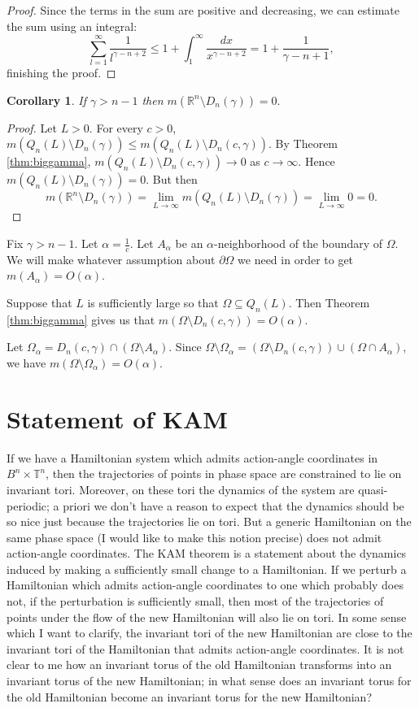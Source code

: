 \documentclass{article}
\newtheorem{corollary}[theorem]{Corollary}
\begin{document}
\begin{proof}
Since the terms in the sum are positive and decreasing, we can estimate the sum using an integral:
\[
\sum_{l=1}^\infty \frac{1}{l^{\gamma-n+2}} \leq 1+ \int_1^\infty
\frac{dx}{x^{\gamma-n+2}} = 1+ \frac{1}{\gamma-n+1},
\]
finishing the proof.
\end{proof}

\begin{corollary}
If $\gamma>n-1$ then $m(\mathbb{R}^n \setminus D_n(\gamma))=0.$ 
\end{corollary}
\begin{proof}
Let $L>0$. For every $c>0$, $m(Q_n(L) \setminus D_n(\gamma))
\leq m(Q_n(L) \setminus D_n(c,\gamma))$. By Theorem \ref{thm:biggamma},
$m(Q_n(L) \setminus D_n(c,\gamma)) \to 0$ as $c \to \infty$. Hence
$m(Q_n(L) \setminus D_n(\gamma))=0$. But then
\[
m(\mathbb{R}^n \setminus
D_n(\gamma)) = \lim_{L \to \infty} m(Q_n(L) \setminus D_n(\gamma))
=\lim_{L \to \infty} 0 =0.
\]
\end{proof}

Fix $\gamma>n-1$.
Let $\alpha=\frac{1}{c}$. Let $A_\alpha$ be an $\alpha$-neighborhood of the boundary of $\Omega$. We will make whatever assumption
about $\partial \Omega$ we need in order to get $m(A_\alpha)=O(\alpha)$. 

Suppose that $L$ is sufficiently large so that $\Omega \subseteq Q_n(L)$. Then Theorem \ref{thm:biggamma} gives us that $m(\Omega \setminus D_n(c,\gamma))=
O(\alpha)$.

Let $\Omega_\alpha=D_n(c,\gamma) \cap (\Omega \setminus A_\alpha)$.
Since $\Omega \setminus \Omega_\alpha = (\Omega \setminus D_n(c,\gamma)) \cup
(\Omega \cap A_\alpha)$, we have
$m(\Omega \setminus \Omega_\alpha)=O(\alpha)$.



\section{Statement of KAM}
If we have a Hamiltonian system which admits action-angle coordinates
in $B^n \times \mathbb{T}^n$, then the trajectories of points in phase
space are constrained to lie on invariant tori. Moreover, on these tori
the dynamics of the system are quasi-periodic; a priori we don't have a reason to expect that the dynamics should be so nice just because the trajectories lie on tori. But a generic Hamiltonian on the same phase space (I would like to make
this notion precise) does not admit action-angle coordinates. The KAM
theorem is a statement about the dynamics induced by making a sufficiently small change to a Hamiltonian. If we perturb a Hamiltonian which admits
action-angle coordinates to one which probably does not, if the perturbation
is sufficiently small, then most of the trajectories of points under the flow of the new Hamiltonian will also lie on tori. In some sense which I want to clarify, the invariant tori of the new Hamiltonian are close to the invariant
tori of the Hamiltonian that admits action-angle coordinates. It is not
clear to me how an invariant torus of the old Hamiltonian transforms into
an invariant torus of the new Hamiltonian; in what sense does an invariant torus for the old Hamiltonian become an invariant torus for the new Hamiltonian?
\end{document}
